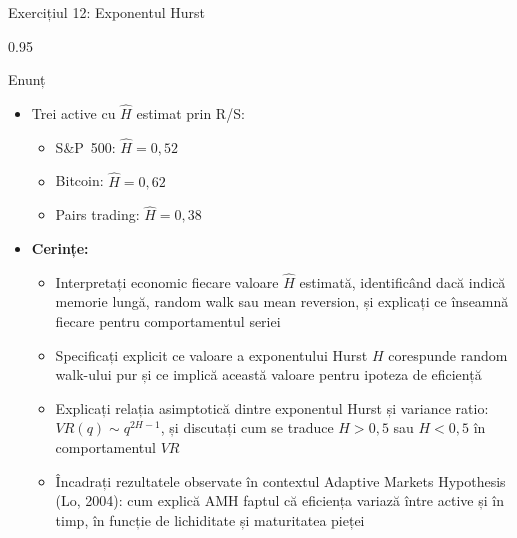 \documentclass[9pt, aspectratio=169, t]{beamer}
\begin{document}
\begin{frame}[shrink=25]{Exercițiul 12: Exponentul Hurst}
\begin{cminipage}{0.95\textwidth}
\begin{block}{Enunț}
\begin{itemize}\setlength{\itemsep}{0pt}
    \item Trei active cu $\hat H$ estimat prin R/S:
    \begin{itemize}\setlength{\itemsep}{0pt}
        \item S\&P~500: $\hat H = 0{,}52$
        \item Bitcoin: $\hat H = 0{,}62$
        \item Pairs trading: $\hat H = 0{,}38$
    \end{itemize}
    \item \textbf{Cerințe:}
    \begin{itemize}\setlength{\itemsep}{0pt}
        \item Interpretați economic fiecare valoare $\hat H$ estimată, identificând dacă indică memorie lungă, random walk sau mean reversion, și explicați ce înseamnă fiecare pentru comportamentul seriei
        \item Specificați explicit ce valoare a exponentului Hurst $H$ corespunde random walk-ului pur și ce implică această valoare pentru ipoteza de eficiență
        \item Explicați relația asimptotică dintre exponentul Hurst și variance ratio: $VR(q) \sim q^{2H-1}$, și discutați cum se traduce $H > 0{,}5$ sau $H < 0{,}5$ în comportamentul $VR$
        \item Încadrați rezultatele observate în contextul Adaptive Markets Hypothesis (Lo, 2004): cum explică AMH faptul că eficiența variază între active și în timp, în funcție de lichiditate și maturitatea pieței
    \end{itemize}
\end{itemize}
\end{block}
\end{cminipage}
\end{frame}
\end{document}
